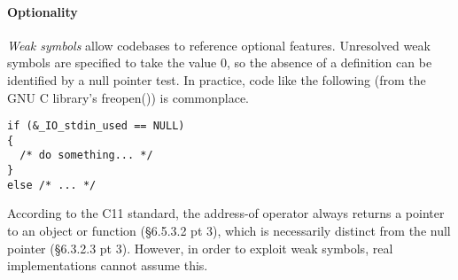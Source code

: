 
\paragraph{Optionality}

\emph{Weak symbols} allow codebases to reference optional features. 
Unresolved weak symbols are specified to take the value 0, so 
the absence of a definition can be identified by a null pointer test.
In practice, code like the following (from the GNU C library's 
\textsf{freopen()}) is commonplace.

{\scriptsize\begin{lstlisting}
if (&_IO_stdin_used == NULL)
{
  /* do something... */
}
else /* ... */
\end{lstlisting}}

According to the C11 standard, the address-of operator 
always returns a pointer to an object or function
(\S 6.5.3.2 pt 3), which is necessarily distinct from the null pointer
(\S6.3.2.3 pt 3).
However, in order to exploit weak symbols, real implementations
cannot assume this.

% 

